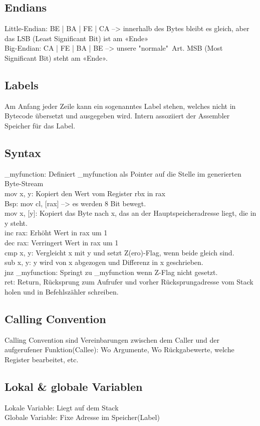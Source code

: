\subsection{Endians}
\textcolor{myblue}{Little-Endian}: BE | BA | FE | CA	--> innerhalb des Bytes bleibt es gleich, aber das LSB (Least Significant Bit) ist am «Ende»\\
\textcolor{myblue}{Big-Endian}: CA | FE | BA | BE --> unsere "normale"\ Art. MSB (Most Significant Bit) steht am «Ende».
\subsection{Labels}
Am Anfang jeder Zeile kann ein sogenanntes Label stehen, welches nicht in Bytecode übersetzt und ausgegeben wird. Intern assoziiert der Assembler Speicher für das Label.
\subsection{Syntax}
\textcolor{myblue}{\_myfunction}: Definiert \_myfunction als Pointer auf die Stelle im generierten Byte-Stream\\
\textcolor{myblue}{mov x, y}: Kopiert den Wert vom Register rbx in rax\\
Bsp: mov cl, [rax] –> es werden 8 Bit bewegt.\\
\textcolor{myblue}{mov x, [y]}: Kopiert das Byte nach x, das an der Hauptspeicheradresse liegt,
die in y steht.\\
\textcolor{myblue}{inc rax}: Erhöht Wert in rax um 1\\
\textcolor{myblue}{dec rax}: Verringert Wert in rax um 1\\
\textcolor{myblue}{cmp x, y}: Vergleicht x mit y und setzt Z(ero)-Flag, wenn beide gleich sind.\\
\textcolor{myblue}{sub x, y}: y wird von x abgezogen und Differenz in x geschrieben.\\
\textcolor{myblue}{jnz \_myfunction}: Springt zu \_myfunction wenn Z-Flag nicht gesetzt.\\
\textcolor{myblue}{ret}: Return, Rücksprung zum Aufrufer und vorher Rücksprungadresse vom Stack holen und in Befehlszähler schreiben.
\subsection{Calling Convention}
Calling Convention sind Vereinbarungen zwischen dem Caller und
der aufgerufener Funktion(Callee): Wo Argumente, Wo Rückgabewerte, welche
Register bearbeitet, etc.\\
\subsection{Lokal \& globale Variablen}
\textcolor{myblue}{Lokale Variable}: Liegt auf dem Stack\\
\textcolor{myblue}{Globale Variable}: Fixe Adresse im Speicher(Label)